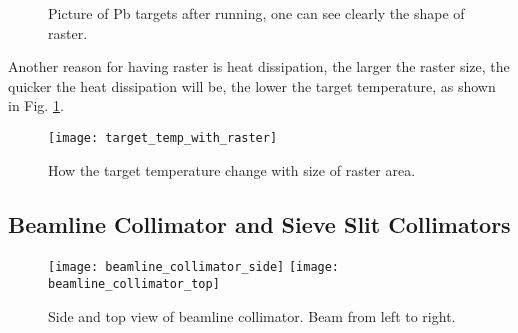 \begin{figure}
    \caption{Picture of Pb targets after running, one can see clearly the shape
    of raster.}
\end{figure}

Another reason for having raster is heat dissipation, the larger the raster size,
the quicker the heat dissipation will be, the lower the target temperature, as
shown in Fig. \ref{fig:target_temp_with_raster}.
\begin{figure}
    \centering
    \texttt{[image: target\_temp\_with\_raster]}
    \caption{How the target temperature change with size of raster area.}
    \label{fig:target_temp_with_raster}
\end{figure}

\subsection{Beamline Collimator and Sieve Slit Collimators}
\begin{figure}[h!]
    \centering
    \texttt{[image: beamline\_collimator\_side]}
    \hspace{1 cm}
    \texttt{[image: beamline\_collimator\_top]}
    \caption{Side and top view of beamline collimator. Beam from left to right.}
    \label{fig:beamline_collimator}
\end{figure}

